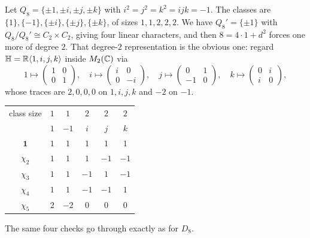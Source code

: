\documentclass[a4paper]{scrartcl}
\newcommand{\gen}[1]{\langle #1 \rangle}
\newcommand{\HH}{\mathbb{H}}
\begin{document}
\begin{example}
	Let $Q_8 = \{\pm1,\pm i,\pm j,\pm k\}$ with $i^2=j^2=k^2=ijk=-1$. The classes are $\{1\},\{-1\},\{\pm i\},\{\pm j\},\{\pm k\}$, of sizes $1,1,2,2,2$. We have $Q_8' = \{\pm1\}$ with $Q_8/Q_8'\cong C_2\times C_2$, giving four linear characters, and then $8 = 4\cdot 1 + d^2$ forces one more of degree $2$. That degree-$2$ representation is the obvious one: regard $\HH = \R\gen{1,i,j,k}$ inside $M_2(\mathbb{C})$ via
	$$1\mapsto \begin{pmatrix}1&0\\0&1\end{pmatrix},\quad i \mapsto \begin{pmatrix}i&0\\0&-i\end{pmatrix},\quad j\mapsto\begin{pmatrix}0&1\\-1&0\end{pmatrix},\quad k\mapsto\begin{pmatrix}0&i\\i&0\end{pmatrix},$$
	whose traces are $2, 0,0,0$ on $1,i,j,k$ and $-2$ on $-1$.
	\begin{center}
	\renewcommand{\arraystretch}{1.3}
	\setlength{\tabcolsep}{11pt}
	\begin{tabular}{c|ccccc}
	\toprule
	class size & $1$ & $1$ & $2$ & $2$ & $2$\\
	 & $1$ & $-1$ & $i$ & $j$ & $k$\\
	\midrule
	$\mathbf 1$ & $1$ & $1$ & $1$ & $1$ & $1$\\
	$\chi_2$ & $1$ & $1$ & $1$ & $-1$ & $-1$\\
	$\chi_3$ & $1$ & $1$ & $-1$ & $1$ & $-1$\\
	$\chi_4$ & $1$ & $1$ & $-1$ & $-1$ & $1$\\
	$\chi_5$ & $2$ & $-2$ & $0$ & $0$ & $0$\\
	\bottomrule
	\end{tabular}
	\end{center}
	The same four checks go through exactly as for $D_8$.
\end{example}
\end{document}

